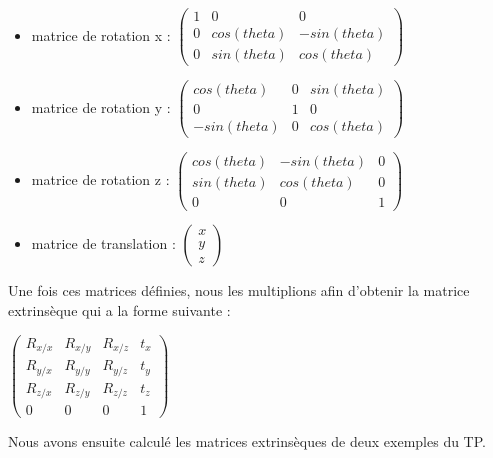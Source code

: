 \documentclass[a4paper,11pt]{article}
\begin{document}
  \begin{itemize}
   \item matrice de rotation x : 
   $\begin{pmatrix}
     1 & 0 & 0\\
     0 & cos(theta) & -sin(theta)\\
     0 & sin(theta) & cos(theta)
    \end{pmatrix}$
    
   \item matrice de rotation y : 
   $\begin{pmatrix}
     cos(theta) & 0 & sin(theta)\\
     0 & 1 & 0\\
     -sin(theta) & 0 & cos(theta)
    \end{pmatrix}$
    
   \item matrice de rotation z : 
   $\begin{pmatrix}
     cos(theta) & -sin(theta) & 0\\
     sin(theta) & cos(theta) & 0\\
     0 & 0 & 1
    \end{pmatrix}$
    
   \item matrice de translation : 
   $\begin{pmatrix}
     x\\
     y\\
     z
    \end{pmatrix}$

  \end{itemize}
  
  Une fois ces matrices définies, nous les multiplions afin d'obtenir la matrice
  extrinsèque qui a la forme suivante :\\
  \begin{center}
    $\begin{pmatrix}
      R_{x/x} & R_{x/y} & R_{x/z} & t_{x}\\
      R_{y/x} & R_{y/y} & R_{y/z} & t_{y}\\
      R_{z/x} & R_{z/y} & R_{z/z} & t_{z}\\
      0 & 0 & 0 & 1
      \end{pmatrix}$
  \end{center}
  
  Nous avons ensuite calculé les matrices extrinsèques de deux exemples du TP.\\
  
\end{document}
